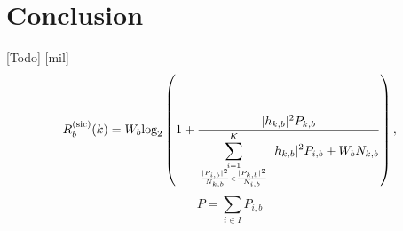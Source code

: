 \section{Conclusion}
\label{sec_conclusion}
[Todo]
[mil]
\begin{equation}
\label{eq_sic_shannon}
R_b^{\text{(sic)}}(k)=W_b \text{log}_2 \left(1+\frac{|h_{k, b}|^2 P_{k, b}}{\displaystyle\sum^K_{{i=1} \atop {\frac{|P_{i, b}|^2}{N_{k, b}} < \frac{|P_{k, b}|^2}{N_{i, b}}}} |h_{k, b}|^2 P_{i, b} +W_b N_{k, b}} \right),
\end{equation}
\begin{equation}
\label{eq_sic_shannon}
P = \underset{i\in I}{\sum} P_{i,b}
\end{equation}
